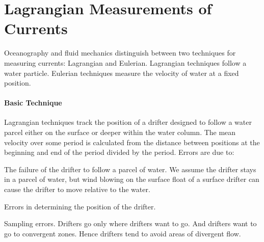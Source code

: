 \section{Lagrangian Measurements of Currents}
Oceanography and fluid mechanics
distinguish between two techniques for measuring currents: Lagrangian
and Eulerian. Lagrangian techniques follow a water particle. Eulerian
techniques measure the velocity of water at a fixed position.

\paragraph{Basic Technique}
Lagrangian techniques track the position of a drifter designed to
follow a water parcel either on the surface or deeper within the water
column. The mean velocity over some period is calculated from the
distance between positions at the beginning and end of the period
divided by the period. Errors are due to:
\begin{enumerate}
\vitem The failure of the drifter to follow a parcel of water. We
assume the drifter stays in a parcel of water, but wind blowing on the
surface float of a surface drifter can cause the drifter to move
relative to the water.

\vitem Errors in determining the position of the drifter.

\vitem Sampling errors. Drifters go only where
drifters want to
go. And drifters want to go to convergent zones. Hence drifters tend
to avoid areas of divergent flow.
\end{enumerate}

